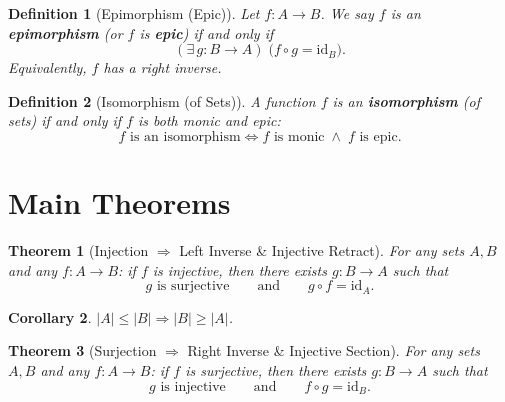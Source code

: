 \documentclass[11pt]{article}
\theoremstyle{defstyle}
\newtheorem{definition}{Definition}[section]
\theoremstyle{thmstyle}
\newtheorem{theorem}{Theorem}[section]
\newtheorem{corollary}[theorem]{Corollary}
\theoremstyle{notstyle}
\theoremstyle{cautionstyle}
\newcommand{\id}{\mathrm{id}}
\begin{document}
\begin{defbox}
\begin{definition}[Epimorphism (Epic)]
Let $f\colon A \to B$. We say $f$ is an \textbf{epimorphism} (or $f$ is \textbf{epic})
if and only if
\[
  (\exists\, g\colon B \to A)\;\bigl(f \circ g = \id_B\bigr).
\]
Equivalently, $f$ has a right inverse.
\end{definition}
\end{defbox}

\begin{defbox}
\begin{definition}[Isomorphism (of Sets)]
A function $f$ is an \textbf{isomorphism} (of sets) if and only if $f$ is both monic
and epic:
\[
  f \text{ is an isomorphism} \iff f \text{ is monic} \;\wedge\; f \text{ is epic}.
\]
\end{definition}
\end{defbox}

\section{Main Theorems}

\begin{thmbox}
\begin{theorem}[Injection $\Rightarrow$ Left Inverse \& Injective Retract]
For any sets $A, B$ and any $f\colon A \to B$: if $f$ is injective, then there exists
$g\colon B \to A$ such that
\[
  g \text{ is surjective} \qquad\text{and}\qquad g \circ f = \id_A.
\]
\end{theorem}
\end{thmbox}

\begin{thmbox}
\begin{corollary}
$|A| \leq |B| \Rightarrow |B| \geq |A|$.
\end{corollary}
\end{thmbox}

\begin{thmbox}
\begin{theorem}[Surjection $\Rightarrow$ Right Inverse \& Injective Section]
For any sets $A, B$ and any $f\colon A \to B$: if $f$ is surjective, then there exists
$g\colon B \to A$ such that
\[
  g \text{ is injective} \qquad\text{and}\qquad f \circ g = \id_B.
\]
\end{theorem}
\end{thmbox}
\end{document}
